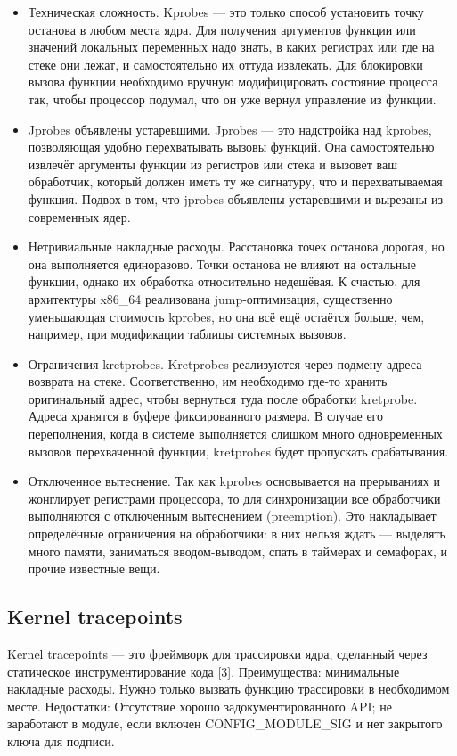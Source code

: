 	\begin{itemize}
		\item Техническая сложность. Kprobes — это только способ установить точку останова в любом места ядра. Для получения аргументов функции или значений локальных переменных надо знать, в каких регистрах или где на стеке они лежат, и самостоятельно их оттуда извлекать. Для блокировки вызова функции необходимо вручную модифицировать состояние процесса так, чтобы процессор подумал, что он уже вернул управление из функции.
		\item Jprobes объявлены устаревшими. Jprobes — это надстройка над kprobes, позволяющая удобно перехватывать вызовы функций. Она самостоятельно извлечёт аргументы функции из регистров или стека и вызовет ваш обработчик, который должен иметь ту же сигнатуру, что и перехватываемая функция. Подвох в том, что jprobes объявлены устаревшими и вырезаны из современных ядер.
		\item Нетривиальные накладные расходы. Расстановка точек останова дорогая, но она выполняется единоразово. Точки останова не влияют на остальные функции, однако их обработка относительно недешёвая. К счастью, для архитектуры x86\_64 реализована jump-оптимизация, существенно уменьшающая стоимость kprobes, но она всё ещё остаётся больше, чем, например, при модификации таблицы системных вызовов.
		\item Ограничения kretprobes. Kretprobes реализуются через подмену адреса возврата на стеке. Соответственно, им необходимо где-то хранить оригинальный адрес, чтобы вернуться туда после обработки kretprobe. Адреса хранятся в буфере фиксированного размера. В случае его переполнения, когда в системе выполняется слишком много одновременных вызовов перехваченной функции, kretprobes будет пропускать срабатывания.
		\item Отключенное вытеснение. Так как kprobes основывается на прерываниях и жонглирует регистрами процессора, то для синхронизации все обработчики выполняются с отключенным вытеснением (preemption). Это накладывает определённые ограничения на обработчики: в них нельзя ждать — выделять много памяти, заниматься вводом-выводом, спать в таймерах и семафорах, и прочие известные вещи.
	\end{itemize}


	\subsection{Kernel tracepoints}
	Kernel tracepoints — это фреймворк для трассировки ядра, сделанный через статическое инструментирование кода [3]. 
	Преимущества:
	минимальные накладные расходы. Нужно только вызвать функцию трассировки в необходимом месте.
Недостатки:
	Отсутствие хорошо задокументированного API;
	не заработают в модуле, если включен CONFIG\_MODULE\_SIG и нет закрытого ключа для подписи.


